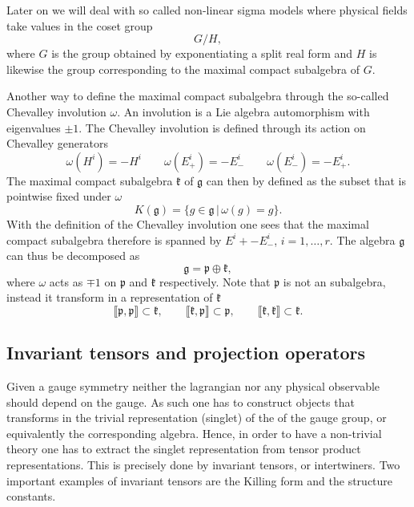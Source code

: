 \documentclass[11pt]{report}
\begin{document}
Later on we will deal with so called non-linear sigma models where physical fields take values in the coset group
\begin{equation}
G/H,
\end{equation}
where $G$ is the group obtained by exponentiating a split real form and $H$ is likewise the group corresponding to the maximal compact subalgebra of $G$.

Another way to define the maximal compact subalgebra through the so-called Chevalley involution $\omega$. An involution is a Lie algebra automorphism with eigenvalues $\pm 1$. The Chevalley involution is defined through its action on Chevalley generators
\begin{equation}
    \omega(H^i) = -H^i\qquad \omega(E^i_+) = -E^i_- \qquad \omega(E^i_-) = -E^i_+.
\end{equation}
The maximal compact subalgebra $\mathfrak{k}$ of $\mathfrak{g}$ can then by defined as the subset that is pointwise fixed under $\omega$
\begin{equation}
    K(\mathfrak{g}) = \{g\in\mathfrak{g}\,|\, \omega (g) = g \}. 
\end{equation}
With the definition of the Chevalley involution one sees that the maximal compact subalgebra therefore is spanned by $E^i+-E^i_-$, $i=1,\ldots,r$. The algebra $\mathfrak{g}$ can thus be decomposed as 
\begin{equation}
    \mathfrak{g} = \mathfrak{p}\oplus\mathfrak{k},
\end{equation}
where $\omega$ acts as $\mp 1$ on $\mathfrak{p}$ and $\mathfrak{k}$ respectively. Note that $\mathfrak{p}$ is not an subalgebra, instead it transform in a representation of $\mathfrak{k}$ 
\begin{equation}
    \llbracket \mathfrak{p},\mathfrak{p}\rrbracket \subset \mathfrak{k},\qquad \llbracket \mathfrak{k},\mathfrak{p}\rrbracket\subset \mathfrak{p},\qquad \llbracket \mathfrak{k},\mathfrak{k}\rrbracket \subset \mathfrak{k}.
\end{equation}



\subsection{Invariant tensors and projection operators}
Given a gauge symmetry neither the lagrangian nor any physical observable should depend on the gauge. As such one has to construct objects that transforms in the trivial representation (singlet) of the of the gauge group, or equivalently the corresponding algebra. Hence, in order to have a non-trivial theory one has to extract the singlet representation from tensor product representations. This is precisely done by invariant tensors, or intertwiners. Two important examples of invariant tensors are the Killing form and the structure constants. 
\end{document}
